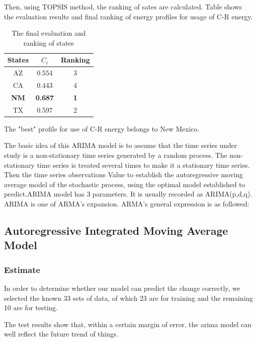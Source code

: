 \documentclass{mcmthesis}
\begin{document}
      Then, using TOPSIS method, the ranking of sates are calculated. Table shows the evaluation results and final ranking of energy profiles for usage of C-R energy.

      \begin{table}
      \begin{tabular}{ccc}
      \hline
      {States}&{$C_i$}&{Ranking}\\
      \hline
      {AZ}&0.554&3\\
      \hline
      {CA}&0.443&4\\
      \hline
      \textbf{NM}&\textbf{0.687}&\textbf{1}\\
      \hline
      {TX}&0.597&2\\
      \hline

      \end{tabular}
      \caption{The final evaluation and ranking of states}
      \end{table}

      The "best" profile for use of C-R energy  belongs to New Mexico.

        The basic idea of this ARIMA model is to assume that the time series under study is a non-stationary time series generated by a random process. The non-stationary time series is treated several times to make it a stationary time series. Then the time series observations Value to establish the autoregressive moving average model of the stochastic process, using the optimal model established to predict.ARIMA model has 3 parameters. It is usually recorded as ARIMA(p,d,q). ARIMA is one of ARMA's expansion.
        ARMA's general expression is as followed:
        


    \subsection{Autoregressive Integrated Moving Average Model}

    \subsubsection{Estimate}

        In order to determine whether our model can predict the change correctly, we selected the known 33 sets of data, of which 23 are for training and the remaining 10 are for testing.

        The test results show that, within a certain margin of error, the arima model can well reflect the future trend of things.
\end{document}
